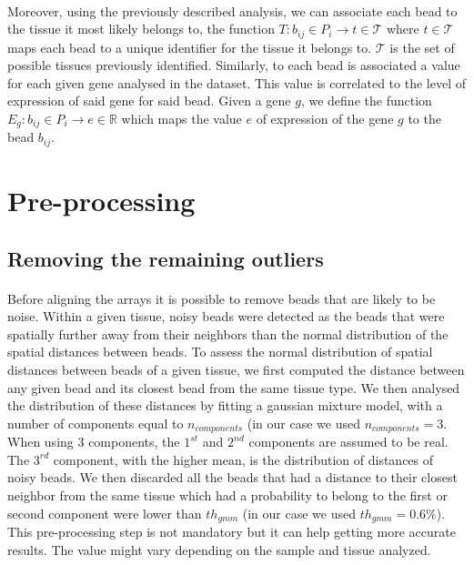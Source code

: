 \documentclass[10pt,a4paper]{article}
\begin{document}
\paragraph{}Moreover, using the previously described analysis, we can associate each bead to the tissue it most likely belongs to, the function \(T:b_{ij}\in P_i\rightarrow t\in\mathcal{T}\) where \(t\in\mathcal{T}\) maps each bead to a unique identifier for the tissue it belongs to. \(\mathcal{T}\) is the set of possible tissues previously identified.
Similarly, to each bead is associated a value for each given gene analysed in the dataset.
This value is correlated to the level of expression of said gene for said bead.
Given a gene \(g\), we define the function \(E_g:b_{ij}\in P_i\rightarrow e\in\mathbb{R}\) which maps the value \(e\) of expression of the gene \(g\) to the bead \(b_{ij}\).
\section{Pre-processing}
\subsection{Removing the remaining outliers}
\paragraph{}Before aligning the arrays it is possible to remove beads that are likely to be noise.
Within a given tissue, noisy beads were detected as the beads that were spatially further away from their neighbors than the normal distribution of the spatial distances between beads.
To assess the normal distribution of spatial distances between beads of a given tissue, we first computed the distance between any given bead and its closest bead from the same tissue type.
We then analysed the distribution of these distances by fitting a gaussian mixture model, with a number of components equal to \(n_{components}\) (in our case we used \(n_{components}=3\).
When using 3 components, the \(1^{st}\) and \(2^{nd}\) components are assumed to be real.
The \(3^{rd}\) component, with the higher mean, is the distribution of distances of noisy beads.
We then discarded all the beads that had a distance to their closest neighbor from the same tissue which had a probability to belong to the first or second component were lower than \(th_{gmm}\) (in our case we used \(th_{gmm}=0.6\%\)).
This pre-processing step is not mandatory but it can help getting more accurate results. The value might vary depending on the sample and tissue analyzed.
\end{document}
